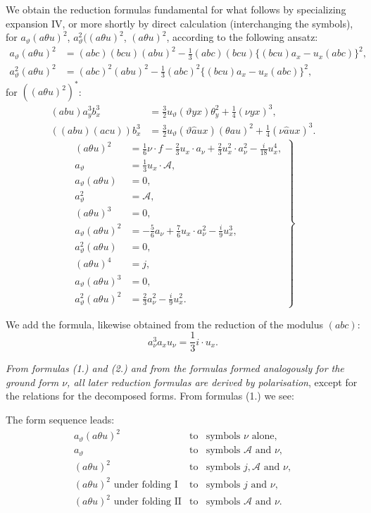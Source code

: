 \documentclass[11pt]{article}
\newcommand{\A}{\mathcal A}
\begin{document}
We obtain the reduction formulas fundamental for what follows by specializing expansion IV, or more shortly by direct calculation (interchanging the symbols), for $a_\vartheta(a\theta u)^2$, $a_\vartheta^2((a\theta u)^2$, $(a\theta u)^2$, according to the following ansatz:
\[
\begin{aligned}
a_\vartheta(a\theta u)^2
&=(abc)(bcu)(abu)^2-\frac13(abc)(bcu)\{(bcu)a_x-u_x(abc)\}^2,\\
a_\vartheta^2(a\theta u)^2
&=(abc)^2(abu)^2-\frac13(abc)^2\{(bcu)a_x-u_x(abc)\}^2,
\end{aligned}
\]
for $((a\theta u)^2)^{*}$:
\[
\begin{aligned}
(abu)a_y^3b_x^3&=\frac32u_\vartheta(\vartheta yx)\theta_y^2+\frac14(\nu yx)^3,\\
((abu)(acu))b_x^3&=\frac32u_\vartheta(\vartheta\widehat{a}ux)(\theta au)^2+\frac14(\nu\widehat{a}ux)^3.
\end{aligned}
\]
\[
\left.
\begin{aligned}
(a\theta u)^2&=\frac16\nu\cdot f-\frac23u_x\cdot a_\nu
+\frac23u_x^2\cdot a_\nu^2-\frac{i}{18}u_x^4,\\
a_\vartheta&=\frac13u_x\cdot\A,\\
a_\vartheta(a\theta u)&=0,\\
a_\vartheta^2&=\A,\\
(a\theta u)^3&=0,\\
a_\vartheta(a\theta u)^2&=-\frac56a_\nu+\frac76u_x\cdot a_\nu^2-\frac{i}{9}u_x^3,\\
a_\vartheta^2(a\theta u)&=0,\\
(a\theta u)^4&=j,\\
a_\vartheta(a\theta u)^3&=0,\\
a_\vartheta^2(a\theta u)^2&=\frac23a_\nu^2-\frac{i}{9}u_x^2.
\end{aligned}
\right\} \tag{1}
\]

We add the formula, likewise obtained from the reduction of the modulus $(abc)$:
\[
a_\nu^3a_xu_\nu=\frac13 i\cdot u_x. \tag{2}
\]

\emph{From formulas (1.) and (2.) and from the formulas formed analogously for the ground form $\nu$, all later reduction formulas are derived by polarisation}, except for the relations for the decomposed forms. From formulas (1.) we see:

The form sequence leads:
\[
\begin{array}{rcl}
a_\vartheta(a\theta u)^2 &\text{to}& \text{symbols }\nu\text{ alone},\\[0.2em]
a_\vartheta &\text{to}& \text{symbols }\A\text{ and }\nu,\\[0.2em]
(a\theta u)^2 &\text{to}& \text{symbols }j,\A\text{ and }\nu,\\[0.2em]
(a\theta u)^2\text{ under folding I} &\text{to}& \text{symbols }j\text{ and }\nu,\\[0.2em]
(a\theta u)^2\text{ under folding II} &\text{to}& \text{symbols }\A\text{ and }\nu.
\end{array}
\]
\end{document}
